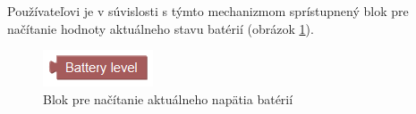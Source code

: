 Používateľovi je v súvislosti s týmto mechanizmom sprístupnený blok pre načítanie hodnoty aktuálneho stavu batérií (obrázok \ref{obr:battery-block}).

\begin{figure}[h]
\centerline{\includegraphics[]{images/battery-block}}
\caption[Blok pre načítanie aktuálneho napätia batérií]{Blok pre načítanie aktuálneho napätia batérií}
\label{obr:battery-block}
\end{figure}
  











